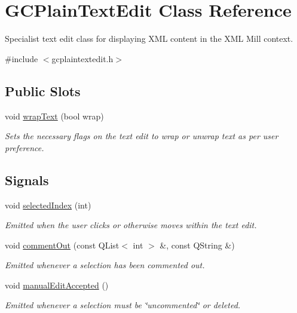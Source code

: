 \hypertarget{class_g_c_plain_text_edit}{\section{\-G\-C\-Plain\-Text\-Edit \-Class \-Reference}
\label{class_g_c_plain_text_edit}
}


\-Specialist text edit class for displaying \-X\-M\-L content in the \-X\-M\-L \-Mill context.  




{\ttfamily \#include $<$gcplaintextedit.\-h$>$}

\subsection*{\-Public \-Slots}
\begin{DoxyCompactItemize}
\item 
void \hyperlink{class_g_c_plain_text_edit_a56df0b287c0440a3f8f0f749929227f2}{wrap\-Text} (bool wrap)
\begin{DoxyCompactList}\small\item\em \-Sets the necessary flags on the text edit to wrap or unwrap text as per user preference. \end{DoxyCompactList}\end{DoxyCompactItemize}
\subsection*{\-Signals}
\begin{DoxyCompactItemize}
\item 
void \hyperlink{class_g_c_plain_text_edit_aa318864494827fed57e319302f74ec89}{selected\-Index} (int)
\begin{DoxyCompactList}\small\item\em \-Emitted when the user clicks or otherwise moves within the text edit. \end{DoxyCompactList}\item 
void \hyperlink{class_g_c_plain_text_edit_a5df13199f02cf478a436689d52924201}{comment\-Out} (const \-Q\-List$<$ int $>$ \&, const \-Q\-String \&)
\begin{DoxyCompactList}\small\item\em \-Emitted whenever a selection has been commented out. \end{DoxyCompactList}\item 
void \hyperlink{class_g_c_plain_text_edit_a1c4c9e285ce6803e23637b725cda37ea}{manual\-Edit\-Accepted} ()
\begin{DoxyCompactList}\small\item\em \-Emitted whenever a selection must be \char`\"{}uncommented\char`\"{} or deleted. \end{DoxyCompactList}\end{DoxyCompactItemize}
